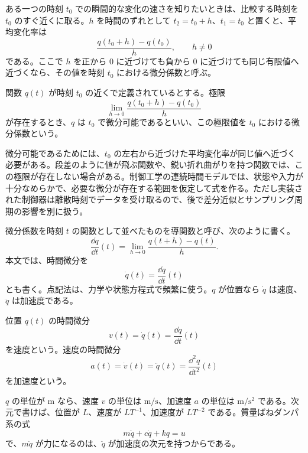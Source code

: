 ある一つの時刻 $t_0$ での瞬間的な変化の速さを知りたいときは、比較する時刻を $t_0$ のすぐ近くに取る。$h$ を時間のずれとして $t_2=t_0+h$、$t_1=t_0$ と置くと、平均変化率は
\begin{equation}
  \frac{q(t_0+h)-q(t_0)}{h},\qquad h\ne0
\end{equation}
である。ここで $h$ を正から 0 に近づけても負から 0 に近づけても同じ有限値へ近づくなら、その値を時刻 $t_0$ における微分係数と呼ぶ。

\begin{definition}[微分係数]
関数 $q(t)$ が時刻 $t_0$ の近くで定義されているとする。極限
\begin{equation}
  \lim_{h\to0}\frac{q(t_0+h)-q(t_0)}{h}
\end{equation}
が存在するとき、$q$ は $t_0$ で微分可能であるといい、この極限値を $t_0$ における微分係数という。
\end{definition}

微分可能であるためには、$t_0$ の左右から近づけた平均変化率が同じ値へ近づく必要がある。段差のように値が飛ぶ関数や、鋭い折れ曲がりを持つ関数では、この極限が存在しない場合がある。制御工学の連続時間モデルでは、状態や入力が十分なめらかで、必要な微分が存在する範囲を仮定して式を作る。ただし実装された制御器は離散時刻でデータを受け取るので、後で差分近似とサンプリング周期の影響を別に扱う。

微分係数を時刻 $t$ の関数として並べたものを導関数と呼び、次のように書く。
\begin{equation}
  \frac{\dd q}{\dd t}(t)
  =\lim_{h\to0}\frac{q(t+h)-q(t)}{h}.
\end{equation}
本文では、時間微分を
\begin{equation}
  \dot{q}(t)=\frac{\dd q}{\dd t}(t)
\end{equation}
とも書く。点記法は、力学や状態方程式で頻繁に使う。$q$ が位置なら $\dot{q}$ は速度、$\ddot{q}$ は加速度である。

\begin{definition}[速度と加速度]
位置 $q(t)$ の時間微分
\begin{equation}
  v(t)=\dot{q}(t)=\frac{\dd q}{\dd t}(t)
\end{equation}
を速度という。速度の時間微分
\begin{equation}
  a(t)=\dot{v}(t)=\ddot{q}(t)=\frac{\dd^2 q}{\dd t^2}(t)
\end{equation}
を加速度という。
\end{definition}

$q$ の単位が m なら、速度 $v$ の単位は $\mathrm{m/s}$、加速度 $a$ の単位は $\mathrm{m/s^2}$ である。次元で書けば、位置が $L$、速度が $LT^{-1}$、加速度が $LT^{-2}$ である。質量ばねダンパ系の式
\begin{equation}
  m\ddot{q}+c\dot{q}+kq=u
\end{equation}
で、$m\ddot{q}$ が力になるのは、$\ddot{q}$ が加速度の次元を持つからである。

